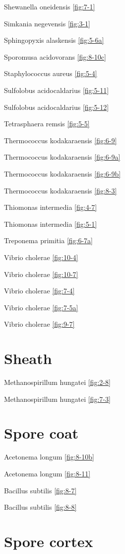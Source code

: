 \documentclass[]{tufte-book}
\begin{document}
Shewanella oneidensis \ref{fig:7-1}

Simkania negevensis \ref{fig:3-1}

Sphingopyxis alaskensis \ref{fig:5-6a}

Sporomusa acidovorans \ref{fig:8-10c}

Staphylococcus aureus \ref{fig:5-4}

Sulfolobus acidocaldarius \ref{fig:5-11}

Sulfolobus acidocaldarius \ref{fig:5-12}

Tetrasphaera remsis \ref{fig:5-5}

Thermococcus kodakaraensis \ref{fig:6-9}

Thermococcus kodakaraensis \ref{fig:6-9a}

Thermococcus kodakaraensis \ref{fig:6-9b}

Thermococcus kodakaraensis \ref{fig:8-3}

Thiomonas intermedia \ref{fig:4-7}

Thiomonas intermedia \ref{fig:5-1}

Treponema primitia \ref{fig:6-7a}

Vibrio cholerae \ref{fig:10-4}

Vibrio cholerae \ref{fig:10-7}

Vibrio cholerae \ref{fig:7-4}

Vibrio cholerae \ref{fig:7-5a}

Vibrio cholerae \ref{fig:9-7}

\section{\texorpdfstring{\textbf{Sheath}}{Sheath}}\label{sheath}

Methanospirillum hungatei \ref{fig:2-8}

Methanospirillum hungatei \ref{fig:7-3}

\section{\texorpdfstring{\textbf{Spore
coat}}{Spore coat}}\label{spore-coat}

Acetonema longum \ref{fig:8-10b}

Acetonema longum \ref{fig:8-11}

Bacillus subtilis \ref{fig:8-7}

Bacillus subtilis \ref{fig:8-8}

\section{\texorpdfstring{\textbf{Spore
cortex}}{Spore cortex}}\label{spore-cortex}
\end{document}
